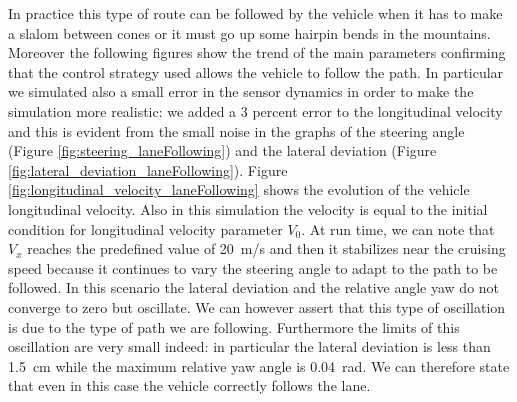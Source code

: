 In practice this type of route can be followed by the vehicle when it has to make a slalom between cones or it must go up some hairpin bends in the mountains. Moreover the following figures show the trend of the main parameters confirming that the control strategy used allows the vehicle to follow the path. In particular we simulated also a small error in the sensor dynamics in order to make the simulation more realistic: we added a 3 percent error to the longitudinal velocity and this is evident from the small noise in the graphs of the steering angle (Figure \ref{fig:steering_laneFollowing}) and the lateral deviation (Figure \ref{fig:lateral_deviation_laneFollowing}).
Figure {\ref{fig:longitudinal_velocity_laneFollowing}} shows the evolution of the vehicle longitudinal velocity. Also in this simulation the velocity is equal to the initial condition for longitudinal velocity parameter $V_0$. At run time, we can note that $V_x$ reaches the predefined value of \SI{20}{m/s} and then it stabilizes near the cruising speed because it continues to vary the steering angle to adapt to the path to be followed. In this scenario the lateral deviation and the relative angle yaw do not converge to zero but oscillate. We can however assert that this type of oscillation is due to the type of path we are following. Furthermore the limits of this oscillation are very small indeed: in particular the lateral deviation is less than \SI{1.5}{cm} while the maximum relative yaw angle is \SI{0.04}{rad}. We can therefore state that even in this case the vehicle correctly follows the lane.
